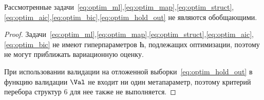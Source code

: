\begin{theorem}Рассмотренные задачи~\eqref{eq:optim_ml},\eqref{eq:optim_map},\eqref{eq:optim_struct},\eqref{eq:optim_aic},\eqref{eq:optim_bic},\eqref{eq:optim_hold_out} не являются обобщающими.
\end{theorem}
\begin{proof}
Задачи~\eqref{eq:optim_ml},\eqref{eq:optim_map},\eqref{eq:optim_struct},\eqref{eq:optim_aic},\eqref{eq:optim_bic} не имеют гиперпараметров $\mathbf{h}$, подлежащих оптимизации, поэтому не могут приближать вариационную оценку.

При  использовании валидации на отложенной выборки~\eqref{eq:optim_hold_out} в функцию валидации $\Val$ не входит ни один метапараметр, поэтому критерий перебора структур 6 для нее также не выполняется. 
\end{proof}

